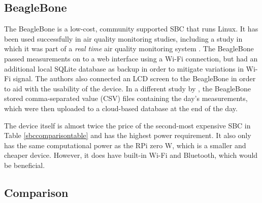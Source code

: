 \documentclass[11pt,twosided,a4paper]{report}
\begin{document}
\subsection{BeagleBone}

The BeagleBone is a low-cost, community supported SBC that runs Linux. It has been used successfully in air quality monitoring studies, including a study in which it was part of a \textit{real time} air quality monitoring system \citep{Min2014airfeedbeagle}. The BeagleBone passed measurements on to a web interface using a Wi-Fi connection, but had an additional local SQLite database as backup in order to mitigate variations in Wi-Fi signal. The authors also connected an LCD screen to the BeagleBone in order to aid with the usability of the device. In a different study by \cite{Desai2017beagleboneblack}, the BeagleBone stored comma-separated value (CSV) files containing the day's measurements, which were then uploaded to a cloud-based database at the end of the day. 

The device itself is almost twice the price of the second-most expensive SBC in Table \ref{sbccomparisontable} and has the highest power requirement. It also only has the same computational power as the RPi zero W, which is a smaller and cheaper device. However, it does have built-in Wi-Fi and Bluetooth, which would be beneficial.

\subsection{Comparison} \label{sbccomparison}
\end{document}
